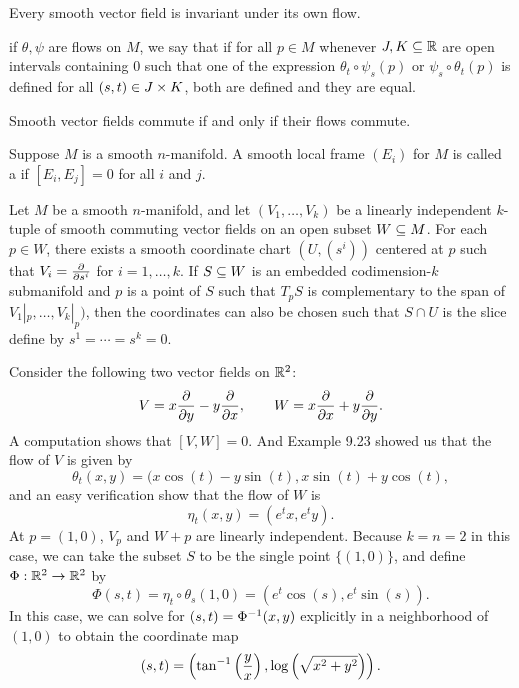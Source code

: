 \begin{cor}
Every smooth vector field is invariant under its own flow.
\end{cor}

\dfn if $\theta, \psi$ are flows on $M$, we say that  if for all $p\in M$ whenever $J,K\subseteq \mathbb{R}$ are open intervals containing 0 such that one of the expression $\theta_t\circ\psi_s(p)$ or $\psi_s\circ \theta_t(p)$ is defined for all $(s,t)\in J\times K$, both are defined and they are equal.

\begin{thm}
Smooth vector fields commute if and only if their flows commute.
\end{thm}

\dfn Suppose $M$ is a smooth $n$-manifold. A smooth local frame $(E_i)$ for $M$ is called a  if $[E_i,E_j] = 0$ for all $i$ and $j$.

\setcounter{thm}{45}

\begin{thm}
Let $M$ be a smooth $n$-manifold, and let $(V_1,\ldots,V_k)$ be a linearly independent $k$-tuple of smooth commuting vector fields on an open subset $W\subseteq M$. For each $p\in W$, there exists a smooth coordinate chart $(U, (s^i))$ centered at $p$ such that $V_i = \frac{\partial}{\partial s^i}$ for $i = 1,\ldots,k$. If $S\subseteq W$ is an embedded codimension-$k$ submanifold and $p$ is a point of $S$ such that $T_pS$ is complementary to the span of $V_1|_p,\ldots,V_k|_p)$, then the coordinates can also be chosen such that $S\cap U$ is the slice define by $s^1 = \cdots = s^k = 0$.
\end{thm}

\begin{ex}
Consider the following two vector fields on $\mathbb{R}^2$:
\[V = x\frac{\partial}{\partial y}-y\frac{\partial}{\partial x},\qquad W = x\frac{\partial}{\partial x} + y\frac{\partial}{\partial y}.\]
A computation shows that $[V,W] = 0$. And Example 9.23 showed us that the flow of $V$ is given by 
\[\theta_t(x,y) = (x\cos(t) - y\sin(t), x\sin(t) + y\cos(t),\]
and an easy verification show that the flow of $W$ is 
\[\eta_t(x,y) = (e^t x, e^t y).\]
At $p = (1,0)$, $V_p$ and $W+p$ are linearly independent. Because $k = n = 2$ in this case, we can take the subset $S$ to be the single point $\{(1,0)\}$, and define $\Phi:\mathbb{R}^2\rightarrow \mathbb{R}^2$ by 
\[\Phi(s,t) = \eta_t\circ \theta_s(1,0) = (e^t\cos(s),e^t\sin(s)).\]
In this case, we can solve for $(s,t) = \Phi^{-1}(x,y)$ explicitly in a neighborhood of $(1,0)$ to obtain the coordinate map 
\[(s,t) = \left(\tan^{-1}\left(\frac{y}{x}\right),\log\left(\sqrt{x^2 + y^2}\right)\right).\]
\end{ex}

























